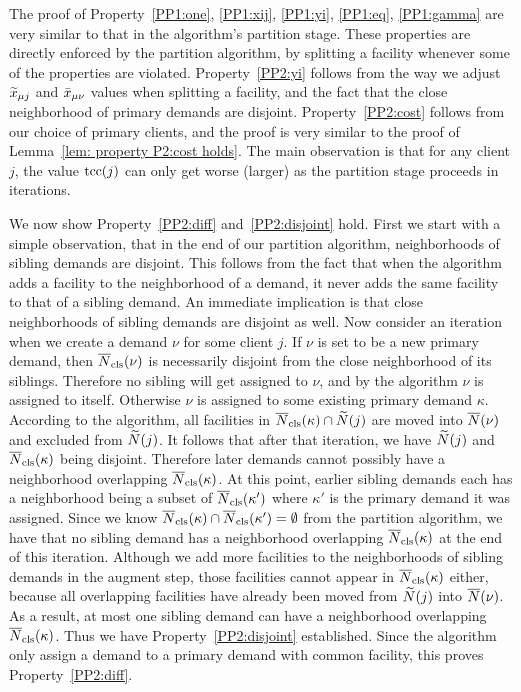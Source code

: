 \documentclass[11pt]{article}
\begin{document}
  The proof of
Property~\ref{PP1:one}, \ref{PP1:xij}, \ref{PP1:yi},
\ref{PP1:eq}, \ref{PP1:gamma} are very similar to that in
the {\EGUP} algorithm's partition stage. These properties
are directly enforced by the partition algorithm, by
splitting a facility whenever some of the properties are
violated. Property~\ref{PP2:yi} follows from the way we
adjust ${\widetilde x}_{\mu j}$ and ${\bar x}_{\mu \nu}$ values when
splitting a facility, and the fact that the close
neighborhood of primary demands are
disjoint. Property~\ref{PP2:cost} follows from our choice of
primary clients, and the proof is very similar to the proof
of Lemma~\ref{lem: property P2:cost holds}. The main
observation is that for any client $j$, the value $\textrm{tcc}(j)$
can only get worse (larger) as the partition stage proceeds
in iterations.

We now show Property~\ref{PP2:diff} and~\ref{PP2:disjoint}
hold. First we start with a simple observation, that in the
end of our partition algorithm, neighborhoods of sibling
demands are disjoint. This follows from the fact that when
the algorithm adds a facility to the neighborhood of a
demand, it never adds the same facility to that of a sibling
demand. An immediate implication is that close neighborhoods
of sibling demands are disjoint as well. Now consider an
iteration when we create a demand $\nu$ for some client
$j$. If $\nu$ is set to be a new primary demand, then
${\overline{N}}_{\text{cls}}(\nu)$ is necessarily disjoint from the close
neighborhood of its siblings. Therefore no sibling will get
assigned to $\nu$, and by the algorithm $\nu$ is assigned to
itself. Otherwise $\nu$ is assigned to some existing primary
demand $\kappa$. According to the algorithm, all facilities
in ${\overline{N}}_{\text{cls}}(\kappa) \cap {\widetilde N}(j)$ are moved into
${\overline{N}}(\nu)$ and excluded from ${\widetilde N}(j)$. It follows
that after that iteration, we have ${\widetilde N}(j)$ and
${\overline{N}}_{\text{cls}}(\kappa)$ being disjoint. Therefore later demands
cannot possibly have a neighborhood overlapping
${\overline{N}}_{\text{cls}}(\kappa)$. At this point, earlier sibling demands
each has a neighborhood being a subset of
${\overline{N}}_{\text{cls}}(\kappa')$ where $\kappa'$ is the primary demand
it was assigned. Since we know ${\overline{N}}_{\text{cls}}(\kappa)\cap
{\overline{N}}_{\text{cls}}(\kappa')=\emptyset$ from the partition algorithm,
we have that no sibling demand has a neighborhood
overlapping ${\overline{N}}_{\text{cls}}(\kappa)$ at the end of this
iteration. Although we add more facilities to the
neighborhoods of sibling demands in the augment step, those
facilities cannot appear in ${\overline{N}}_{\text{cls}}(\kappa)$ either,
because all overlapping facilities have already been moved
from ${\widetilde N}(j)$ into ${\overline{N}}(\nu)$. As a result, at most
one sibling demand can have a neighborhood overlapping
${\overline{N}}_{\text{cls}}(\kappa)$. Thus we have
Property~\ref{PP2:disjoint} established. Since the algorithm
only assign a demand to a primary demand with common
facility, this proves Property~\ref{PP2:diff}.
\end{document}
